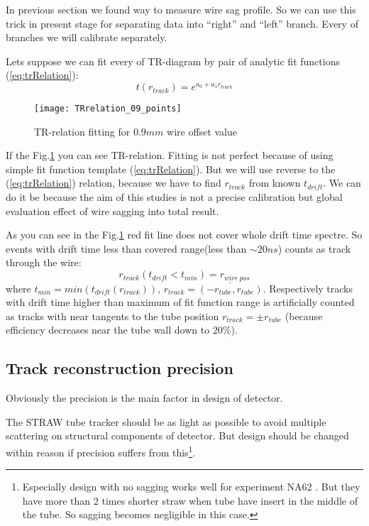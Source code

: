 	In previous section we found way to measure wire sag profile. So we can use this trick in present stage for separating data into ``right'' and ``left'' branch. Every of branches we will calibrate separately.
	
	Lets suppose we can fit every of TR-diagram by pair of analytic fit functions (\ref{eq:trRelation}):
	\begin{equation}
	t(r_{track}) = e^{a_0 + a_1r_{track}}
	\label{eq:trRelation}
	\end{equation}
	
	\begin{figure}[h!]
	\centering
	\texttt{[image: TRrelation\_09\_points]}

	\caption{TR-relation fitting for $0.9 mm$ wire offset value}
	\label{fig:TRrelation09p}
	\end{figure}
	
	If the Fig.\ref{fig:TRrelation09p} you can see TR-relation. Fitting is not perfect because of using simple fit function template (\ref{eq:trRelation}). But we will use reverse to the (\ref{eq:trRelation}) relation, because we have to find $r_{track}$ from known $t_{drift}$. We can do it be because the aim of this studies is not a precise calibration but global evaluation effect of wire sagging into total result.
	
	As you can see in the Fig.\ref{fig:TRrelation09p} red fit line does not cover whole drift time spectre. So events with drift time less than covered range(less than $\sim20 ns$) counts as track through the wire:
	\begin{equation}
	r_{track}(t_{drift} < t_{min}) = r_{wire~pos}
	\end{equation}
	where $t_{min} = min (t_{drift}(r_{track}))$, $r_{track} = \overline{(-r_{tube},r_{tube})}$. Respectively tracks with drift time higher than maximum of fit function range is artificially counted as tracks with near tangents to the tube position $r_{track} = \pm r_{tube}$  (because efficiency decreases near the tube wall down to $20\%$).
	
	\subsection{Track reconstruction precision}
	
	Obviously the precision is the main factor in design of detector.
	
	The STRAW tube tracker should be as light as possible to avoid multiple scattering on structural components of detector. But design should be changed within reason if precision suffers from this\footnote{Especially design with no sagging works well for experiment NA62 \cite{}. But they have more than 2 times shorter  straw when tube have insert in the middle of the tube. So sagging becomes negligible in this case.}.
	
